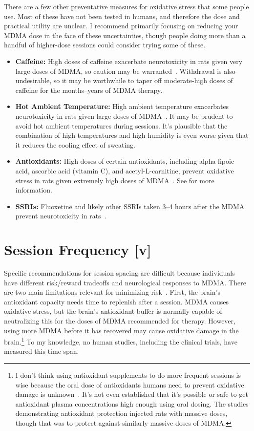 \documentclass[11pt,oneside]{book}
\let\cite\parencite
\begin{document}
There are a few other preventative measures for oxidative stress that some people use. Most of these have not been tested in humans, and therefore the dose and practical utility are unclear. I recommend primarily focusing on reducing your MDMA dose in the face of these uncertainties, though people doing more than a handful of higher-dose sessions could consider trying some of these.
\begin{itemize}
    \item \textbf{Caffeine:} High doses of caffeine exacerbate neurotoxicity in rats given very large doses of MDMA, so caution may be warranted~\cite{vanattouCaffeine}. Withdrawal is also undesirable, so it may be worthwhile to taper off moderate-high doses of caffeine for the months--years of MDMA therapy.
    \item \textbf{Hot Ambient Temperature:} High ambient temperature exacerbates neurotoxicity in rats given large doses of MDMA~\cite{baggottDamage}. It may be prudent to avoid hot ambient temperatures during sessions. It's plausible that the combination of high temperatures and high humidity is even worse given that it reduces the cooling effect of sweating.
    \item \textbf{Antioxidants:} High doses of certain antioxidants, including alpha-lipoic acid, ascorbic acid (vitamin C), and acetyl-L-carnitine, prevent oxidative stress in rats given extremely high doses of MDMA~\cite{aguirre1999alpha,shankaran2001ascorbic,alves2009acetyl}. See \textcite{baggottSupplements} for more information.
    \item \textbf{SSRIs:} Fluoxetine and likely other SSRIs taken 3--4 hours after the MDMA prevent neurotoxicity in rats~\cite{baggottDamage}.
\end{itemize}

\section{Session Frequency [v]}
\label{frequency}
Specific recommendations for session spacing are difficult because individuals have different risk/reward tradeoffs and neurological responses to MDMA. There are two main limitations relevant for minimizing risk~\cite{baggottSerotonin,baggottDamage}. First, the brain's antioxidant capacity needs time to replenish after a session. MDMA causes oxidative stress, but the brain's antioxidant buffer is normally capable of neutralizing this for the doses of MDMA recommended for therapy. However, using more MDMA before it has recovered may cause oxidative damage in the brain.\footnote{I don't think using antioxidant supplements to do more frequent sessions is wise because the oral dose of antioxidants humans need to prevent oxidative damage is unknown~\cite{baggottSupplements}. It's not even established that it's possible or safe to get antioxidant plasma concentrations high enough using oral dosing. The studies demonstrating antioxidant protection injected rats with massive doses, though that was to protect against similarly massive doses of MDMA.} To my knowledge, no human studies, including the clinical trials, have measured this time span. 
\end{document}
